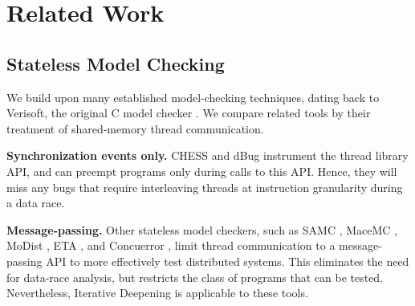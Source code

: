 \section{Related Work}
\label{sec:related}

\subsection{Stateless Model Checking}

We build upon many established model-checking techniques, dating back
to Verisoft, the original C model checker \cite{verisoft}.
We compare related tools by their treatment of shared-memory thread communication.

{\bf Synchronization events only.} CHESS \cite{chess} and dBug \cite{dbug-ssv} instrument the thread library API, and can preempt programs only during calls to this API.
Hence, they will miss any bugs that require interleaving threads at instruction granularity during a data race.

{\bf Message-passing.} Other stateless model checkers, such as SAMC \cite{samc}, MaceMC \cite{macemc}, MoDist \cite{modist}, ETA \cite{dbug-retreat}, and Concuerror \cite{optimal-dpor},
limit thread communication to a message-passing API to more effectively test distributed systems.
This eliminates the need for data-race analysis, but restricts the class of programs that can be tested.
Nevertheless, Iterative Deepening is applicable to these tools.


